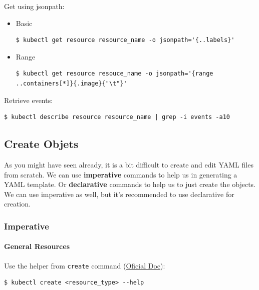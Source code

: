 \documentclass{article}
\newenvironment{codetemplate}[1][]{%
  \mybasecolorbox[#1]
  \itshape
}{%
  \endmybasecolorbox
}
\begin{document}
Get using jsonpath:
\begin{itemize}
    \item Basic
\begin{codetemplate}
\begin{verbatim}
$ kubectl get resource resource_name -o jsonpath='{..labels}'
\end{verbatim}
\end{codetemplate}

    \item Range
\begin{codetemplate}
\begin{verbatim}
$ kubectl get resource resouce_name -o jsonpath='{range ..containers[*]}{.image}{"\t"}'
\end{verbatim}
\end{codetemplate}
\end{itemize}

Retrieve events:
\begin{codetemplate}
\begin{verbatim}
$ kubectl describe resource resource_name | grep -i events -a10
\end{verbatim}
\end{codetemplate}

\subsection{Create Objets}
As you might have seen already, it is a bit difficult to create and edit YAML files 
from scratch. We can use \textbf{imperative} commands to help us in generating a 
YAML template. Or \textbf{declarative} commands to help us to just create the objects.
We can use imperative as well, but it's recommended to use declarative for creation.

\subsubsection{Imperative}

\paragraph{General Resources}
Use the helper from \verb|create| command (\href{https://jamesdefabia.github.io/docs/user-guide/kubectl/kubectl_create/}{Oficial Doc}):
\begin{codetemplate}
\begin{verbatim}
$ kubectl create <resource_type> --help
\end{verbatim}
\end{codetemplate}
\end{document}
